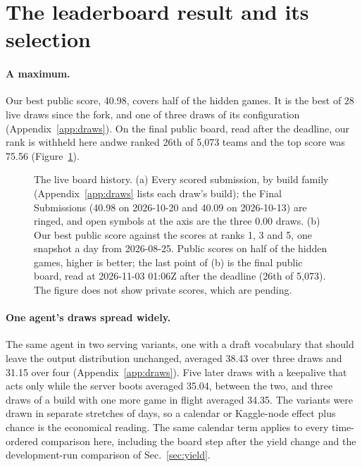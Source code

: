 \section{The leaderboard result and its selection}\label{sec:board}

\paragraph{A maximum.}
Our best public score, 40.98, covers half of the hidden games. %
It is the best of 28 live draws since the fork, and one of three draws of its configuration (Appendix~\ref{app:draws}). %
On the final public board, read after the deadline, \ifanon our rank is withheld here and\else we ranked 26th of 5,073 teams and\fi{} the top score was 75.56 (Figure~\ref{fig:draws}). %

\begin{figure}[t]
\centering
\ifanon{}\else{}\fi
\caption{The live board history. (a) Every scored submission, by build family (Appendix~\ref{app:draws} lists each draw's build); the Final Submissions (40.98 on 2026-10-20 and 40.09 on 2026-10-13) are ringed, and open symbols at the axis are the three 0.00 draws. (b) Our best public score against the scores at ranks 1, 3 and 5, one snapshot a day from 2026-08-25. Public scores on half of the hidden games, higher is better; the last point of (b) is the final public board, read at 2026-11-03 01:06Z after the deadline\ifanon\else{} (26th of 5,073)\fi. The figure does not show private scores, which are pending.}\label{fig:draws} %
\end{figure}

\paragraph{One agent's draws spread widely.}
The same agent in two serving variants, one with a draft vocabulary that should leave the output distribution unchanged, averaged 38.43 over three draws and 31.15 over four (Appendix~\ref{app:draws}). %
Five later draws with a keepalive that acts only while the server boots averaged 35.04, between the two, and three draws of a build with one more game in flight averaged 34.35. %
The variants were drawn in separate stretches of days, so a calendar or Kaggle-node effect plus chance is the economical reading.
The same calendar term applies to every time-ordered comparison here, including the board step after the yield change and the development-run comparison of Sec.~\ref{sec:yield}.

